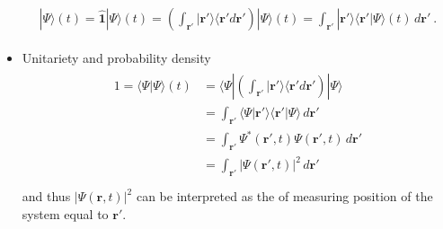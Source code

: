 \documentclass[letterpaper,10pt,english]{jupyterBook}
\begin{document}
\begin{itemize}
\begin{equation*}
\begin{split}
\begin{aligned}
  | \Psi \rangle (t) = \hat{\mathbf{1}} | \Psi \rangle(t) 
    = \left( \int_{\mathbf{r}'} | \mathbf{r}' \rangle \langle \mathbf{r}' d \mathbf{r}' \right) | \Psi \rangle(t) 
    = \int_{\mathbf{r}'} | \mathbf{r}' \rangle \langle \mathbf{r}' | \Psi \rangle(t) \, d \mathbf{r}' \ .
  \end{aligned}\end{split}
\end{equation*}
\item {} 
\sphinxAtStartPar
Unitariety and probability density
\begin{equation*}
\begin{split}\begin{aligned}
  1 = \langle \Psi | \Psi \rangle (t) 
    & = \langle \Psi | \left( \int_{\mathbf{r}'} | \mathbf{r}' \rangle \langle \mathbf{r}' d \mathbf{r}' \right) | \Psi \rangle \\
    & = \int_{\mathbf{r}'} \langle \Psi | \mathbf{r}' \rangle \langle \mathbf{r}' | \Psi \rangle \, d \mathbf{r}' \\
    & = \int_{\mathbf{r}'} \Psi^*(\mathbf{r}',t) \Psi(\mathbf{r}',t) \, d \mathbf{r}' \\
    & = \int_{\mathbf{r}'} \left| \Psi(\mathbf{r}',t) \right|^2 \, d \mathbf{r}' \\
  \end{aligned}\end{split}
\end{equation*}
\sphinxAtStartPar
and thus \(\left|\Psi(\mathbf{r},t)\right|^2\) can be interpreted as the  of measuring position of the system equal to \(\mathbf{r}'\).


\end{itemize}
\end{document}
